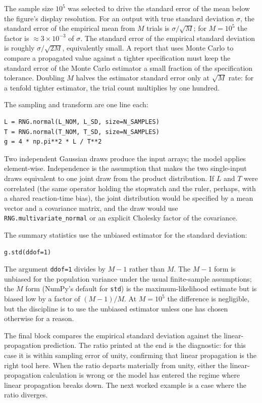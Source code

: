 The sample size $10^{5}$ was selected to drive the standard error of
the mean below the figure's display resolution. For an output with
true standard deviation $\sigma$, the standard error of the
empirical mean from $M$ trials is $\sigma/\sqrt{M}$; for $M=10^{5}$
the factor is $\approx 3 \times 10^{-3}$ of $\sigma$. The standard
error of the empirical standard deviation is roughly
$\sigma/\sqrt{2M}$, equivalently small. A report that uses Monte
Carlo to compare a propagated value against a tighter specification
must keep the standard error of the Monte Carlo estimator a small
fraction of the specification tolerance. Doubling $M$ halves the
estimator standard error only at $\sqrt{M}$ rate: for a tenfold
tighter estimator, the trial count multiplies by one hundred.

The sampling and transform are one line each:

\begin{verbatim}
L = RNG.normal(L_NOM, L_SD, size=N_SAMPLES)
T = RNG.normal(T_NOM, T_SD, size=N_SAMPLES)
g = 4 * np.pi**2 * L / T**2
\end{verbatim}

Two independent Gaussian draws produce the input arrays; the model
applies element-wise. Independence is the assumption that makes the
two single-input draws equivalent to one joint draw from the product
distribution. If $L$ and $T$ were correlated (the same operator
holding the stopwatch and the ruler, perhaps, with a shared
reaction-time bias), the joint distribution would be specified by a
mean vector and a covariance matrix, and the draw would use
\texttt{RNG.multivariate\_normal} or an explicit Cholesky factor of
the covariance.

The summary statistics use the unbiased estimator for the standard
deviation:

\begin{verbatim}
g.std(ddof=1)
\end{verbatim}

The argument \texttt{ddof=1} divides by $M-1$ rather than $M$. The
$M-1$ form is unbiased for the population variance under the usual
finite-sample assumptions; the $M$ form (NumPy's default for
\texttt{std}) is the maximum-likelihood estimate but is biased low
by a factor of $(M-1)/M$. At $M=10^{5}$ the difference is
negligible, but the discipline is to use the unbiased estimator
unless one has chosen otherwise for a reason.

The final block compares the empirical standard deviation against
the linear-propagation prediction. The ratio printed at the end is
the diagnostic: for this case it is within sampling error of unity,
confirming that linear propagation is the right tool here. When the
ratio departs materially from unity, either the linear-propagation
calculation is wrong or the model has entered the regime where
linear propagation breaks down. The next worked example is a case
where the ratio diverges.

